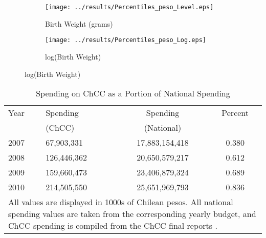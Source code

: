 \documentclass[12pt]{article}
\begin{document}
\begin{spacing}{1.4}
\begin{figure}[htpb!]
  \begin{center}
    \caption{Policy Impact by Percentile}
    \label{quintiles}
    \begin{subfigure}{.5\textwidth}
      \centering
      \texttt{[image: ../results/Percentiles\_peso\_Level.eps]}
      \caption{Birth Weight (grams)}
      \label{quintiles-level}
    \end{subfigure}%
    \begin{subfigure}{.5\textwidth}
      \centering
      \texttt{[image: ../results/Percentiles\_peso\_Log.eps]}
      \caption{log(Birth Weight)}
      \label{quintiles-log}
    \end{subfigure}
  \end{center}
\end{figure}



\begin{table}[htpb!]
  \caption{Spending on ChCC as a Portion of National Spending}
  \label{tab:spending}
  \begin{tabular}{llcc} \toprule
    Year & Spending & Spending & Percent \\
    & (ChCC)        & (National) & \\ \midrule
    2007 & 67,903,331  & 17,883,154,418 & 0.380 \\
    2008 & 126,446,362 & 20,650,579,217 & 0.612 \\
    2009 & 159,660,473 & 23,406,879,324 & 0.689 \\
    2010 & 214,505,550 & 25,651,969,793 & 0.836 \\
    \midrule
    \multicolumn{4}{p{8.1cm}}{{\footnotesize All values are displayed in 1000s of Chilean pesos. All national spending values are taken from the corresponding yearly budget, and ChCC spending
        is compiled from the ChCC final reports \citep{Arrietetal2013}.}} \\ \bottomrule
  \end{tabular}
\end{table}





\end{spacing}
\end{document}
